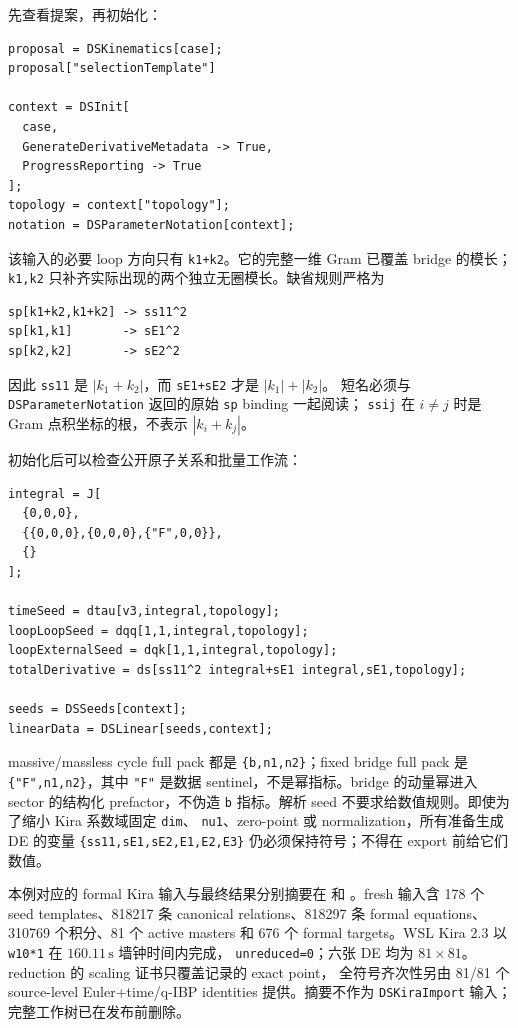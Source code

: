 ﻿\documentclass[a4paper,11pt]{article}
\begin{document}
先查看提案，再初始化：
\begin{verbatim}
proposal = DSKinematics[case];
proposal["selectionTemplate"]

context = DSInit[
  case,
  GenerateDerivativeMetadata -> True,
  ProgressReporting -> True
];
topology = context["topology"];
notation = DSParameterNotation[context];
\end{verbatim}
该输入的必要 loop 方向只有 \texttt{k1+k2}。它的完整一维 Gram 已覆盖 bridge 的模长；
\texttt{k1,k2} 只补齐实际出现的两个独立无圈模长。缺省规则严格为
\begin{verbatim}
sp[k1+k2,k1+k2] -> ss11^2
sp[k1,k1]       -> sE1^2
sp[k2,k2]       -> sE2^2
\end{verbatim}
因此 \texttt{ss11} 是 $|k_1+k_2|$，而 \texttt{sE1+sE2} 才是 $|k_1|+|k_2|$。
短名必须与 \texttt{DSParameterNotation} 返回的原始 \texttt{sp} binding 一起阅读；
\texttt{ssij} 在 $i\ne j$ 时是 Gram 点积坐标的根，不表示 $|k_i+k_j|$。

初始化后可以检查公开原子关系和批量工作流：
\begin{verbatim}
integral = J[
  {0,0,0},
  {{0,0,0},{0,0,0},{"F",0,0}},
  {}
];

timeSeed = dtau[v3,integral,topology];
loopLoopSeed = dqq[1,1,integral,topology];
loopExternalSeed = dqk[1,1,integral,topology];
totalDerivative = ds[ss11^2 integral+sE1 integral,sE1,topology];

seeds = DSSeeds[context];
linearData = DSLinear[seeds,context];
\end{verbatim}
massive/massless cycle full pack 都是 \texttt{\{b,n1,n2\}}；fixed bridge full pack 是
\texttt{\{"F",n1,n2\}}，其中 \texttt{"F"} 是数据 sentinel，不是幂指标。bridge 的动量幂进入
sector 的结构化 prefactor，不伪造 \texttt{b} 指标。解析 seed 不要求给数值规则。即使为了缩小 Kira 系数域固定 \texttt{dim}、
\texttt{nu1}、zero-point 或 normalization，所有准备生成 DE 的变量
\texttt{\{ss11,sE1,sE2,E1,E2,E3\}} 仍必须保持符号；不得在 export 前给它们数值。

本例对应的 formal Kira 输入与最终结果分别摘要在
 和
。fresh 输入含 178 个 seed templates、818217 条
canonical relations、818297 条 formal equations、310769 个积分、81 个 active masters 和 676 个
formal targets。WSL Kira 2.3 以 \texttt{w10*1} 在 $160.11\,\mathrm{s}$ 墙钟时间内完成，
\texttt{unreduced=0}；六张 DE 均为 $81\times81$。reduction 的 scaling 证书只覆盖记录的 exact point，
全符号齐次性另由 81/81 个 source-level Euler+time/q-IBP identities 提供。摘要不作为
\texttt{DSKiraImport} 输入；完整工作树已在发布前删除。
\end{document}
